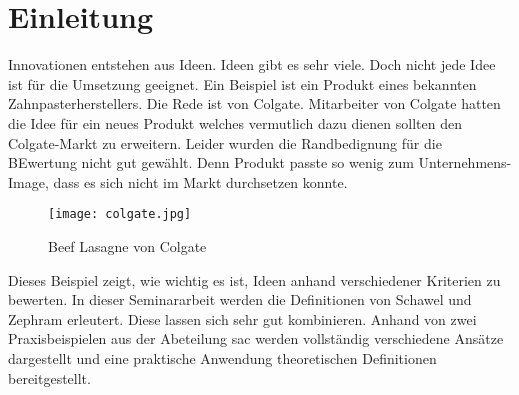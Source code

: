 \section{Einleitung}\label{sec:einleitung}
Innovationen entstehen aus Ideen. Ideen gibt es sehr viele. Doch nicht jede Idee ist für die Umsetzung geeignet. 
Ein Beispiel ist ein Produkt eines bekannten Zahnpasterherstellers. Die Rede ist von Colgate. 
Mitarbeiter von Colgate hatten die Idee für ein neues Produkt welches vermutlich dazu dienen sollten den Colgate-Markt zu 
erweitern. Leider wurden die Randbedignung für die BEwertung nicht gut gewählt. Denn Produkt passte so wenig zum Unternehmens-Image, dass 
es sich nicht im Markt durchsetzen konnte. 
\begin{figure}[ht]
	\centering
	\texttt{[image: colgate.jpg]}
	\caption{Beef Lasagne von Colgate}
	\label{img:colgate}
\end{figure}
Dieses Beispiel zeigt, wie wichtig es ist, Ideen anhand verschiedener Kriterien zu bewerten. 
In dieser Seminararbeit werden die Definitionen von Schawel und Zephram erleutert. Diese lassen sich sehr gut kombinieren. 
Anhand von zwei Praxisbeispielen aus der Abeteilung \ac{sac} werden vollständig verschiedene Ansätze dargestellt und eine 
praktische Anwendung theoretischen Definitionen bereitgestellt. 
